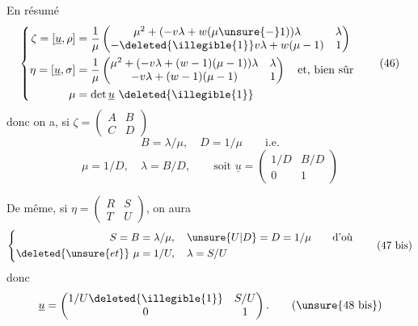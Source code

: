 En résumé
\[
\left\{\begin{aligned}
\zeta=[\underline u,\rho]
&=\frac1\mu\begin{pmatrix}
\mu^2+(-v\lambda+w(\mu\unsure{-}1))\lambda&\lambda\\
-\deleted{\illegible{1}}v\lambda+w(\mu-1)&1
\end{pmatrix}\\
\eta=[\underline u,\sigma]
&=\frac1\mu\begin{pmatrix}
\mu^2+(-v\lambda+(w-1)(\mu-1))\lambda&\lambda\\
-v\lambda+(w-1)(\mu-1)&1
\end{pmatrix}\quad\text{et, bien sûr}\\
\mu&=\det\underline u\ \deleted{\illegible{1}}
\end{aligned}\right. \tag{46}
\]
donc on a, si $\zeta=\begin{pmatrix}A&B\\C&D\end{pmatrix}$
\[
B=\lambda/\mu,\quad D=1/\mu\qquad\text{i.e.} \tag{47}
\]
\[
\mu=1/D,\quad\lambda=B/D,\qquad\text{soit }\underline u=\begin{pmatrix}1/D&B/D\\0&1\end{pmatrix} \tag{48}
\]


De même, si $\eta=\begin{pmatrix}R&S\\T&U\end{pmatrix}$, on aura 
\[
\left\{\begin{aligned}
S=B&=\lambda/\mu,\quad \unsure{U|D}=D=1/\mu\qquad\text{d'où}\\
\deleted{\unsure{et}}\ \mu&=1/U,\quad\lambda=S/U
\end{aligned}\right. \tag{47 bis}
\]
donc
\[
\underline u=\begin{pmatrix}1/U\deleted{\illegible{1}}&S/U\\0&1\end{pmatrix}. \tag{\unsure{48 bis}}
\]

